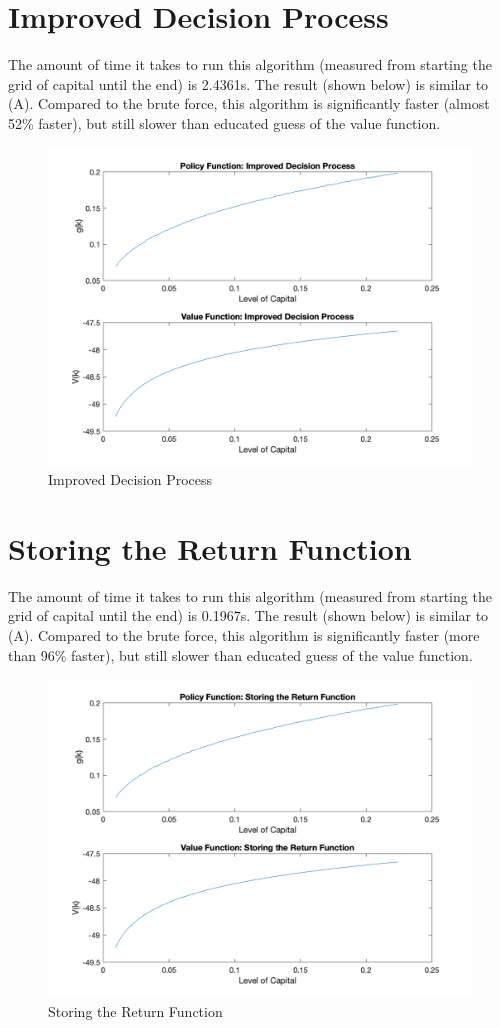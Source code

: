 \documentclass[letter,10.5pt]{article}
\begin{document}
\section{Improved Decision Process}
The amount of time it takes to run this algorithm (measured from starting the grid of capital until the end) is 2.4361s. The result (shown below) is similar to (A). Compared to the brute force, this algorithm is significantly faster (almost 52\% faster), but still slower than educated guess of the value function.
\begin{figure}[hbtp]
\centering
\caption{Improved Decision Process}
\includegraphics[scale=0.27]{part_d.png}
\end{figure}


\section{Storing the Return Function}
The amount of time it takes to run this algorithm (measured from starting the grid of capital until the end) is 0.1967s. The result (shown below) is similar to (A). Compared to the brute force, this algorithm is significantly faster (more than 96\% faster), but still slower than educated guess of the value function.
\begin{figure}[hbtp]
\centering
\caption{Storing the Return Function}
\includegraphics[scale=0.27]{part_e.png}
\end{figure}
\end{document}

